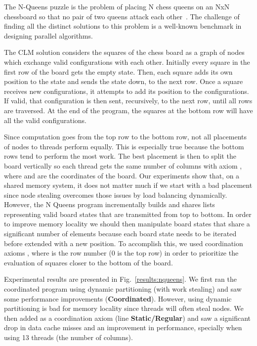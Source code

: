 The N-Queens puzzle is the problem of placing N chess queens on an NxN
chessboard so that no pair of two queens attack each
other~\cite{8queens}. The challenge of finding all the
distinct solutions to this problem is a well-known benchmark in designing
parallel algorithms.

The CLM solution considers the squares of the chess board as a graph
of nodes which exchange valid configurations with each
other. Initially every square in the first row of the board gets the
empty state.  Then, each square adds its own position to the state and
sends the state down, to the next row. Once a square receives new
configurations, it attempts to add its position to the
configurations. If valid, that configuration is then sent,
recursively, to the next row, until all rows are traversed. At the end
of the program, the squares at the bottom row will have all the valid
configurations.

Since computation goes from the top row to the bottom row, not all
placements of nodes to threads perform equally. This is especially
true because the bottom rows tend to perform the most work. The best
placement is then to split the board vertically so each thread gets
the same number of columns with axiom , where
 and  are the coordinates of the board. Our experiments show that, on a shared
memory system, it does not matter much if we start with a bad
placement since node stealing overcomes those issues by load balancing
dynamically.  However, the N Queens program incrementally builds and shares lists representing
valid board states that are transmitted from top to bottom.
In order to improve memory locality we should then manipulate board
states that share a significant number of elements because each board state
needs to be iterated before extended with a new position.
To accomplish this, we used coordination axioms , where  is the row number (0 is the top row) in order to
prioritize the evaluation of squares closer to the bottom of the board.

Experimental results are presented in Fig.~\ref{results:nqueens}.  We
first ran the coordinated program using dynamic partitioning (with
work stealing) and saw some performance improvements
(\textbf{Coordinated}). However, using dynamic partitioning is bad for
memory locality since threads will often steal nodes.  We then
added  as a coordination axiom (line
\textbf{Static/Regular}) and saw a significant drop in data cache misses and an
improvement in performance, specially when using 13 threads (the number of
columns).

